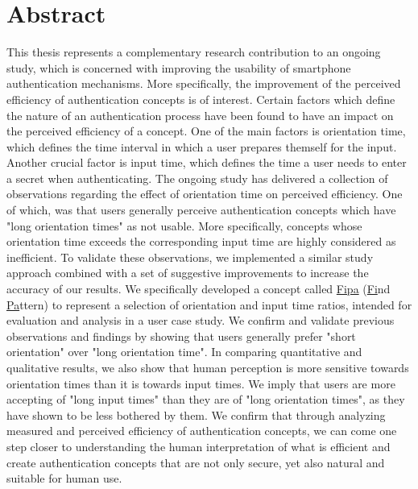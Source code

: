 \begingroup
\let\clearpage\relax
\let\cleardoublepage\relax
\let\cleardoublepage\relax

\chapter*{Abstract}
 This thesis represents a complementary research contribution to an ongoing study, which is concerned with improving the usability of smartphone authentication mechanisms. More specifically, the improvement of the perceived efficiency of authentication concepts is of interest. Certain factors which define the nature of an authentication process have been found to have an impact on the perceived efficiency of a concept. One of the main factors is orientation time, which defines the time interval in which a user prepares themself for the input. Another crucial factor is input time, which defines the time a user needs to enter a secret when authenticating. The ongoing study has delivered a collection of observations regarding the effect of orientation time on perceived efficiency. One of which, was that users generally perceive authentication concepts which have "long orientation times" as not usable. More specifically, concepts whose orientation time exceeds the corresponding input time are highly considered as inefficient. To validate these observations, we implemented a similar study approach combined with a set of suggestive improvements to increase the accuracy of our results. We specifically developed a concept called \underline{Fipa} (\underline{Fi}nd \underline{Pa}ttern) to represent a selection of orientation and input time ratios, intended for evaluation and analysis in a user case study. We confirm and validate previous observations and findings by showing that users generally prefer "short orientation" over "long orientation time". In comparing quantitative and qualitative results, we also show that human perception is more sensitive towards orientation times than it is towards input times. We imply that users are more accepting of "long input times" than they are of "long orientation times", as they have shown to be less bothered by them. We confirm that through analyzing measured and perceived efficiency of authentication concepts, we can come one step closer to understanding the human interpretation of what is efficient and create authentication concepts that are not only secure, yet also natural and suitable for human use. 

